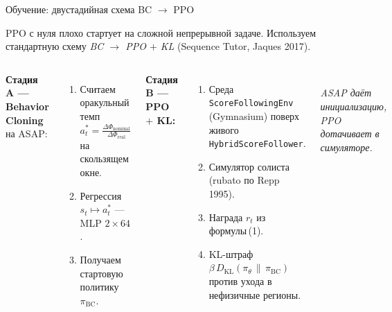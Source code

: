 ﻿%
\begin{frame}{Обучение: двустадийная схема BC $\to$ PPO}
  \footnotesize\setlength{\abovedisplayskip}{2pt}
  \setlength{\belowdisplayskip}{2pt}

  PPO с нуля плохо стартует на сложной непрерывной задаче.
  Используем стандартную схему \emph{BC $\to$ PPO $+$ KL}
  (Sequence Tutor, Jaques 2017).

  \begin{columns}[T,onlytextwidth]
    \textbf{Стадия A --- Behavior Cloning} на ASAP:
    \begin{enumerate}\setlength{\itemsep}{0.2em}
      \item Считаем оракульный темп
            $\displaystyle a^{*}_t = \frac{\Delta\Phi_{\text{nominal}}}{\Delta\Phi_{\text{real}}}$
            на скользящем окне.
      \item Регрессия $s_t \mapsto a^{*}_t$ --- MLP $2\!\times\!64$.
      \item Получаем стартовую политику $\pi_{\text{BC}}$.
    \end{enumerate}

    \vspace{0.4em}
    \textbf{Стадия B --- PPO $+$ KL:}
    \begin{enumerate}\setlength{\itemsep}{0.2em}
      \item Среда \texttt{ScoreFollowingEnv} (Gymnasium) поверх
            живого \texttt{HybridScoreFollower}.
      \item Симулятор солиста (rubato по Repp 1995).
      \item Награда $r_t$ из формулы\,(1).
      \item KL-штраф
            $\beta\,D_{\text{KL}}(\pi_\theta\,\|\,\pi_{\text{BC}})$
            против ухода в нефизичные регионы.
    \end{enumerate}

    \centering
    \resizebox{\linewidth}{!}{%
    }\\[0.4em]
    {\scriptsize\itshape\color{black!70}
     ASAP даёт инициализацию,\\ PPO дотачивает в симуляторе.}
  \end{columns}
\end{frame}
